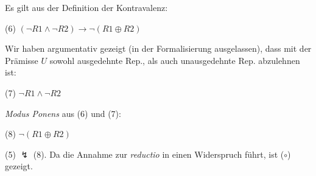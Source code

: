 \documentclass[a4paper, 12pt]{article}
\begin{document}
\vspace{4pt}

\noindent Es gilt aus der Definition der Kontravalenz: 

\vspace{4pt}
(6) \hspace*{1em}  $(\neg R1 \land \neg R2)  \rightarrow \neg (R1 \oplus R2)$
\vspace{4pt}

\noindent Wir haben argumentativ gezeigt (in der Formalisierung ausgelassen), dass mit der Prämisse $U$ sowohl ausgedehnte Rep., als auch unausgedehnte Rep. abzulehnen ist: 

\vspace{4pt}
(7) \hspace*{1em}  $\neg R1 \land \neg R2$

\vspace{4pt}
\noindent \emph{Modus Ponens} aus (6) und (7):

\vspace{4pt}
(8) \hspace*{1em} $\neg (R1 \oplus R2)$


\vspace{14pt}
\noindent (5) $\lightning$ (8).  Da die Annahme zur \emph{reductio} in einen Widerspruch führt, ist ($\circ$) gezeigt.
\end{document}
